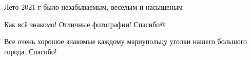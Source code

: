  
 
 
 
 

\qqSecCmt


Лето 2021 г было незабываемым, веселым и насыщеным


Как всё знакомо! Отличные фотографии! Спасибо@


Все очень хорошое знакомые каждому мариупольцу уголки нашего большого города.
Спасибо!
